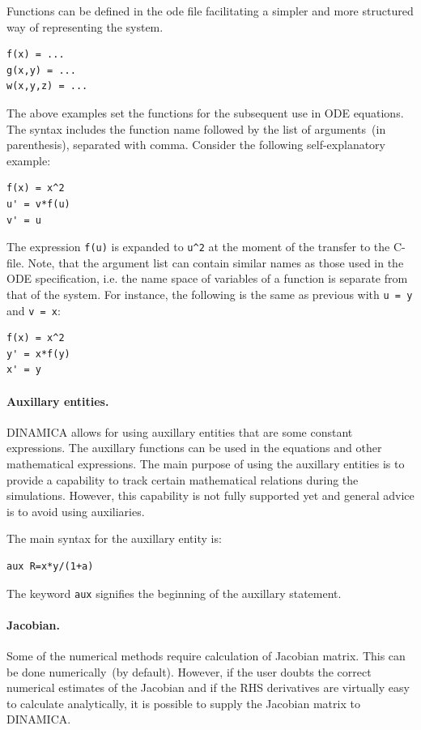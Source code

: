 \documentclass[11pt,a4paper]{article}
\begin{document}
Functions can be defined in the ode file facilitating a simpler and more structured
way of representing the system.
\begin{verbatim}
f(x) = ...
g(x,y) = ...
w(x,y,z) = ...
\end{verbatim}
The above examples set the functions for the subsequent use in ODE equations. The
syntax includes the function name followed by the list of arguments~(in parenthesis),
separated with comma. Consider the following self-explanatory example:
\begin{verbatim}
f(x) = x^2
u' = v*f(u)
v' = u
\end{verbatim}
The expression \verb-f(u)- is expanded to \verb-u^2- at the moment of the transfer
to the C-file. Note, that the argument list can contain similar names as those used
in the ODE specification, i.e. the name space of variables of a function is separate
from that of the system. For instance, the following is the same as previous with
\verb-u = y- and \verb-v = x-:
\begin{verbatim}
f(x) = x^2
y' = x*f(y)
x' = y
\end{verbatim}

\paragraph{Auxillary entities.}
\label{sec:auxillary-entities}

DINAMICA allows for using auxillary entities that are some constant expressions. The
auxillary functions can be used in the equations and other mathematical
expressions. The main purpose of using the auxillary entities is to provide a
capability to track certain mathematical relations during the simulations. However,
this capability is not fully supported yet and general advice is to avoid using
auxiliaries.

The main syntax for the auxillary entity is:
\begin{verbatim}
aux R=x*y/(1+a)
\end{verbatim}
The keyword \verb-aux- signifies the  beginning of the auxillary statement.


\paragraph{Jacobian.}
\label{sec:jacobian}

Some of the numerical methods require calculation of Jacobian matrix. This can be
done numerically~(by default). However, if the user doubts the correct numerical
estimates of the Jacobian and if the RHS derivatives are virtually easy to calculate
analytically, it is possible to supply the Jacobian matrix to DINAMICA.
\end{document}
